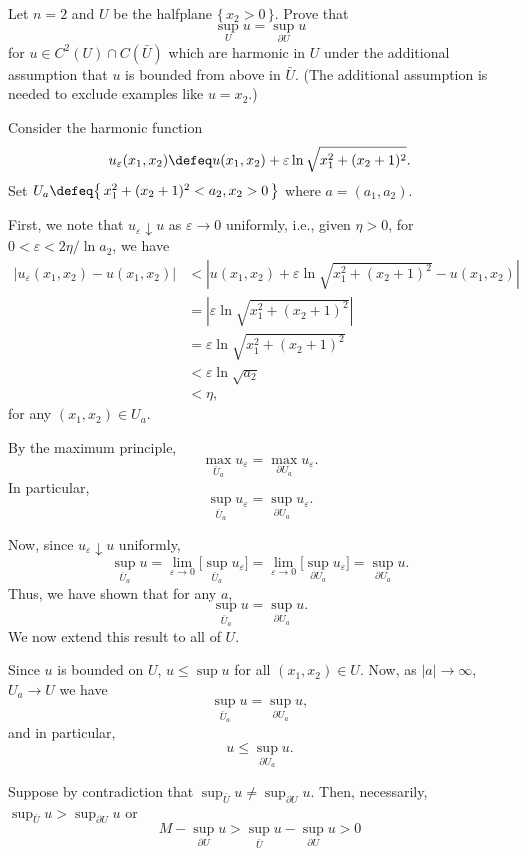 \begin{problem}
  Let \(n=2\) and \(U\) be the halfplane \(\{\,x_2>0\,\}\). Prove that
  \[
    \sup_U u=\sup_{\partial U}u
  \]
  for \(u\in C^2(U)\cap C(\bar U)\) which are harmonic in \(U\) under the
  additional assumption that \(u\) is bounded from above in \(\bar
  U\). (The additional assumption is needed to exclude examples like
  \(u=x_2\).)

\end{problem}
\begin{solution}
  Consider the harmonic function
  \[
    u_\varepsilon(x_1,x_2)\defeq
    u(x_1,x_2)+\varepsilon\ln\sqrt{x_1^2+(x_2+1)^2}.
  \]
  Set \(U_a\defeq \bigl\{\,x_1^2+(x_2+1)^2<a_2,x_2>0\,\bigr\}\) where
  \(a=(a_1,a_2)\).

  First, we note that \(u_\varepsilon\downarrow u\) as \(\varepsilon\to 0\)
  uniformly, i.e., given \(\eta>0\), for \(0<\varepsilon<2\eta/{\ln a_2}\),
  we have
  \begin{align*}
    |u_\varepsilon(x_1,x_2)-u(x_1,x_2)|
    &<\left|
      u(x_1,x_2)+\varepsilon\ln\sqrt{x_1^2+(x_2+1)^2}
      -u(x_1,x_2)
      \right|\\
    &=\left|
      \varepsilon\ln\sqrt{x_1^2+(x_2+1)^2}
      \right|\\
    &=\varepsilon\ln\sqrt{x_1^2+(x_2+1)^2}\\
    &<\varepsilon\ln\sqrt{a_2}\\
    &<\eta,
  \end{align*}
  for any \((x_1,x_2)\in U_a\).

  By the maximum principle,
  \[
    \max_{\bar U_a}u_\varepsilon=\max_{\partial U_a}u_\varepsilon.
  \]
  In particular,
  \[
    \sup_{\bar U_a}u_\varepsilon=\sup_{\partial U_a}u_\varepsilon.
  \]

  Now, since \(u_\varepsilon\downarrow u\) uniformly,
  \[
    \sup_{\bar U_a}u=%
    \lim_{\varepsilon\to 0}\biggl[\sup_{\bar U_a}u_\varepsilon\biggr]=%
    \lim_{\varepsilon\to 0}\biggl[\sup_{\partial U_a}u_\varepsilon\biggr]=%
    \sup_{\partial U_a}u.
  \]
  Thus, we have shown that for any \(a\),
  \begin{equation}
    \label{eq:5:sup-ua}
    \sup_{\bar U_a}u=\sup_{\partial U_a}u.
  \end{equation}
  We now extend this result to all of \(U\).

  Since \(u\) is bounded on \(U\), \(u\leq \sup u\) for all \((x_1,x_2)\in
  U\). Now, as \(|a|\to\infty\), \(U_a\to U\) we have
  \[
    \sup_{\bar U_a}u=\sup_{\partial U_a}u,
  \]
  and in particular,
  \[
    u\leq\sup_{\partial U_a}u.
  \]

  Suppose by contradiction that \(\sup_{\bar U}u\neq\sup_{\partial U}u\).
  Then, necessarily, \(\sup_{\bar U}u>\sup_{\partial U}u\) or
  \[
    M-\sup_{\partial U}u>\sup_{\bar U}u-\sup_{\partial U}u>0
  \]
\end{solution}
\newpage

